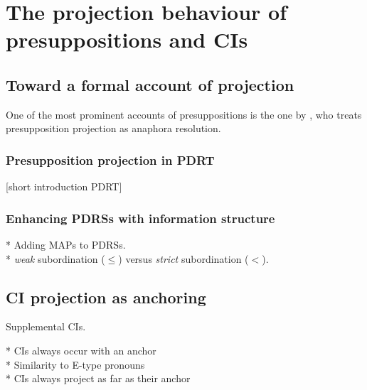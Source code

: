 \section{The projection behaviour of presuppositions and CIs}


\subsection{Toward a formal account of projection}

One of the most prominent accounts of presuppositions is the one by
\citet{sandt1992presupposition}, who treats presupposition projection as
anaphora resolution.

\subsubsection{Presupposition projection in PDRT}

[short introduction PDRT]

\subsubsection{Enhancing PDRSs with information structure}

* Adding MAPs to PDRSs. \\
* \textit{weak} subordination ($\leq$) versus \textit{strict} subordination ($<$).



\subsection{CI projection as anchoring}

Supplemental CIs.


* CIs always occur with an anchor\\
* Similarity to E-type pronouns\\
* CIs always project as far as their anchor




